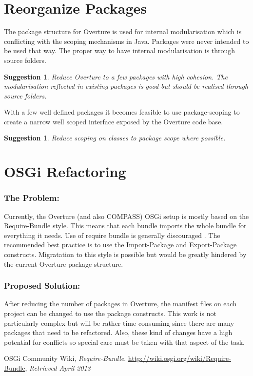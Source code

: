 \documentclass[11pt]{overturerep} \usepackage{t1enc,times,a4,t1enc}
\newtheorem{sug}[subsection]{Suggestion}
\begin{document}
    



\section{Reorganize Packages} The package structure for Overture is used for
internal modularisation which is conflicting with the scoping mechanisms in
Java.  Packages were never intended to be used that way. The proper way to have
internal modularisation is through source folders.

\begin{sug} Reduce Overture to a few packages with high cohesion. The
modularisation reflected in existing packages is good but should be realised
through source folders.  \end{sug}

With a few well defined packages it becomes feasible to use package-scoping to
create a narrow well scoped interface exposed by the Overture code base.

\begin{sug} Reduce scoping on classes to package scope where possible.
\end{sug}




\section{OSGi Refactoring} \label{sec:osgi} 

    \subsubsection{The Problem:} Currently, the Overture (and also COMPASS)
    OSGi setup is mostly based on the \textsf{Require-Bundle} style. This means
    that each bundle imports the whole bundle for everything it needs. Use of
    require bundle is generally discouraged \cite{osgi2013}. The recommended
    best practice is to use the \textsf{Import-Package} and
    \textsf{Export-Package} constructs. Migratation to this style is possible
    but would be greatly hindered by the current Overture package structure.


    \subsubsection{Proposed Solution:} After reducing the number of packages in
    Overture, the manifest files on each project can be changed to use the
    package constructs. This work is not particularly complex but will be
    rather time consuming since there are many packages that need to be
    refactored. Also, these kind of changes have a high potential for conflicts
    so special care must be taken with that aspect of the task.




    \begin{thebibliography}{9}

 OSGi Community Wiki, \emph{Require-Bundle}.
    \url{http://wiki.osgi.org/wiki/Require-Bundle}, \emph{Retrieved April 2013}

\end{thebibliography} 
\end{document}
